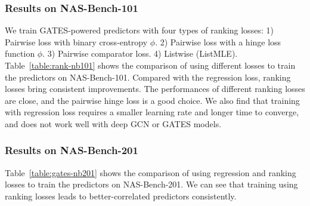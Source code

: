 \subsubsection{Results on NAS-Bench-101}
We train GATES-powered predictors with four types of ranking losses: 1) Pairwise loss with binary cross-entropy $\phi$. 2) Pairwise loss with a hinge loss function $\phi$. 3) Pairwise comparator loss. 4) Listwise (ListMLE).
Table~\ref{table:rank-nb101} shows the comparison of using different losses to train the predictors on NAS-Bench-101. Compared with the regression loss, ranking losses bring consistent improvements.
The performances of different ranking losses are close, and the pairwise hinge loss is a good choice. We also find that training with regression loss requires a smaller learning rate and longer time to converge, and does not work well with 
deep GCN or GATES models.

\subsubsection{Results on NAS-Bench-201}
Table~\ref{table:gates-nb201} shows the comparison of using regression and ranking losses to train the predictors on NAS-Bench-201. We can see that training using ranking losses leads to better-correlated predictors consistently.

